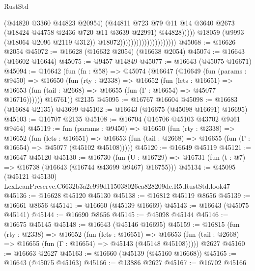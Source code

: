 \begin{lexlean}{RustStd}
\begin{coremodule}
                                                      (@44820 @3360 @44823 @20954)
                                                      (@44811
                                                        @723
                                                        @79
                                                        @11
                                                        @14
                                                        @3640
                                                        @2673
                                                        (@18424 @44758 @2436 @720 @11 @3639 @22991)
                                                        @44828)))))
                                              @18059
                                              (@9993 (@18064 @2096 @2119 @312))
                                              @18072)))))))))))))))))))))
@45068 := @16626 @2054
@45072 := @16628 (@16632 @2054) (@16638 @2054)
@45074 := @16643 (@16602 @16644)
@45075 := @9457 @14849
@45077 := @16643 (@45075 @16671)
@45094 := @16642
    (fun (fn : @58) =>
    @45074
      (@16647
        (@16649
          (fun (params : @9450) =>
          @16650
            (fun (rty : @2338) =>
            @16652
              (fun (lets : @16651) =>
              @16653 (fun (tail : @2668) => @16655 (fun (Γ : @16654) => @45077 @16716))))))
        @16761))
    @2135
@45095 := @16767 @16604
@45098 := @16683 (@16684 @2135) @43699
@45102 := @16643 (@16675 (@45098 @16691) @16695)
@45103 := @16707 @2135
@45108 := @16704 (@16706 @45103 @43702 @9461 @9464)
@45119 := fun (params : @9450) =>
  @16650
    (fun (rty : @2338) =>
    @16652
      (fun (lets : @16651) =>
      @16653 (fun (tail : @2668) => @16655 (fun (Γ : @16654) => @45077 (@45102 @45108)))))
@45120 := @16649 @45119
@45121 := @16647 @45120
@45130 := @16730
    (fun (U : @16729) => @16731 (fun (t : @7) => @16738 (@16643 (@16744 @43699 @9467) @16755)))
@45134 := @45095 (@45121 @45130) LexLeanPreserve.C6632b3a2e999d115038026ca828209de.R5.RustStd.look47
@45136 := @16628 @45120 @45130
@45138 := @16812 @45119 @8656
@45139 := @16661 @8656
@45141 := @16660 (@45139 @16669)
@45143 := @16643 (@45075 @45141)
@45144 := @16690 @8656
@45145 := @45098 @45144
@45146 := @16675 @45145
@45148 := @16643 (@45146 @16695)
@45159 := @16815
    (fun (rty : @2338) =>
    @16652
      (fun (lets : @16651) =>
      @16653 (fun (tail : @2668) => @16655 (fun (Γ : @16654) => @45143 (@45148 @45108)))))
    @2627
@45160 := @16663 @2627
@45163 := @16660 (@45139 (@45160 @16668))
@45165 := @16643 (@45075 @45163)
@45166 := @13886 @2627
@45167 := @16702 @45166

\end{coremodule}
\end{lexlean}
